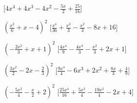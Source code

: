 \begin{esercizio}
\begin{enumeratea}
  \hfill [\(4 x^{4} + 4 x^{3} - 4 x^{2} - \frac{5 x}{2} + \frac{25}{16}\)]
\item \(\left(\frac{x^{2}}{6} + x - 4\right)^{2}\)
  \hfill [\(\frac{x^{4}}{36} + \frac{x^{3}}{3} - \frac{x^{2}}{3} - 8 x + 
16\)]
\item \(\left(- \frac{2 x^{2}}{3} + x + 1\right)^{2}\)
  \hfill [\(\frac{4 x^{4}}{9} - \frac{4 x^{3}}{3} - \frac{x^{2}}{3} + 2 x + 
1\)]
\item \(\left(\frac{3 x^{2}}{2} - 2 x - \frac{2}{3}\right)^{2}\)
  \hfill [\(\frac{9 x^{4}}{4} - 6 x^{3} + 2 x^{2} + \frac{8 x}{3} + 
\frac{4}{9}\)]
\item \(\left(- \frac{5 x^{2}}{4} - \frac{x}{2} + 2\right)^{2}\)
  \hfill [\(\frac{25 x^{4}}{16} + \frac{5 x^{3}}{4} - \frac{19 x^{2}}{4} - 
2 x + 4\)]

\end{enumeratea}
\end{esercizio}
